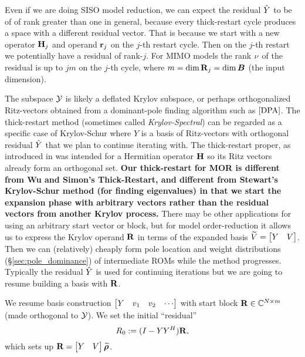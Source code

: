 Even if we are doing SISO model reduction, we can expect the residual $\hat{Y}$ to be of of rank greater than one in general, because every thick-restart cycle produces a space with a different residual vector. That is because we start with a new operator $\textbf{\textup{H}}_j$ and operand $\textbf{\textup{r}}_j$ on the $j$-th restart cycle.   Then on the $j$-th restart we potentially have a residual of rank-$j$.  For MIMO models the rank $\nu$ of the residual is up to $j m$ on the $j$-th  cycle, where $m=\dim \textbf{\textup{R}}_j = \dim \bm{B}$ (the input dimension). 

  The subspace $\mathcal{Y}$ is likely a deflated Krylov subspace, or  perhaps orthogonalized Ritz-vectors obtained from a dominant-pole finding algorithm such as $\cite{DPA}$. 
The thick-restart method (sometimes called \emph{Krylov-Spectral}) can be regarded as a specific case of Krylov-Schur where $Y$ is a basis of Ritz-vectors with orthogonal residual  $\hat{Y}$ that we plan to continue iterating with.   The thick-restart proper, as introduced in \cite{dynamicthick} was intended for a Hermitian operator  $\textbf{\textup{H}}$ so its Ritz vectors already form an orthogonal set.   \textbf{Our thick-restart for MOR is different from Wu and Simon's Thick-Restart, and different from Stewart's Krylov-Schur method (for finding eigenvalues) in that we start the expansion phase with arbitrary vectors rather than the residual vectors from  another Krylov process.}  There may be other applications for using an arbitrary start vector or block, but for model order-reduction it allows us to express the Krylov operand $\textbf{\textup{R}}$ in terms of the expanded basis $\widetilde{V}=\begin{bmatrix} Y&V\end{bmatrix}$.  Then we can (relatively) cheaply form pole location and weight distributions (\S\ref{sec:pole_dominance}) of intermediate ROMs while the method progresses.         
     Typically the residual $\hat{Y}$ is used for  continuing iterations but we are going to resume building a basis with $\textbf{\textup{R}}$.   

We resume basis construction $\begin{bmatrix} Y & v_1& v_2 &\cdots\end{bmatrix}$ with start block  $\textbf{\textup{R}}\in\mathbb{C}^{N\times m}$ (made orthogonal to $\mathcal{Y}$).  We set the initial ``residual''
\begin{equation}
R_0 := (I-YY^H)\textbf{\textup{R}},
\label{eq:new_start}
\end{equation}
which sets up $\textbf{\textup{R}} = \begin{bmatrix} Y & V\end{bmatrix}  \widetilde{\boldsymbol{\rho}}$.  


